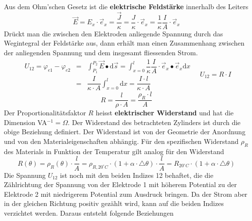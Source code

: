 \noindent Aus dem Ohm'schen Gesetz ist die \textbf{elektrische Feldstärke} innerhalb des Leiters 
\begin{equation}
\boxed{\overrightarrow{E}=E_x\cdot \overrightarrow{e}_x=\dfrac{\overrightarrow{J}}{\kappa}=\dfrac{J}{\kappa}\cdot \overrightarrow{e}_x=\dfrac{1}{\kappa}\dfrac{I}{A}\cdot \overrightarrow{e}_x}
\end{equation}
Drückt man die zwischen den Elektroden anliegende Spannung durch das Wegintegral der Feldstärke aus, dann erhält man einen Zusammenhang zwischen der anliegenden Spannung und dem insgesamt fliessenden Strom.
\begin{equation}
\boxed{
\begin{array}{lll}
U_{12}=\varphi_{e1}-\varphi_{e2}&=&\displaystyle \int_{P_1}^{P_2}\overrightarrow{E}\bullet \text{d}\overrightarrow{s}=\displaystyle \int_{x=0}^l\dfrac{1}{\kappa}\dfrac{I}{A}\cdot \overrightarrow{e}_x\bullet \overrightarrow{e}_x\text{d}x\\
&=&\dfrac{I}{\kappa \cdot A}\displaystyle \int_{x=0}^l\text{d}x=\dfrac{I\cdot l}{\kappa\cdot A}
\end{array}
}\quad 
\boxed{U_{12}=R\cdot I}
\end{equation}
\begin{equation}
\boxed{R=\dfrac{l}{\rho\cdot A}=\dfrac{\rho_R\cdot l}{A}}
\end{equation}
Der Proportionalitätsfaktor $R$ heisst \textbf{elektrischer Widerstand} und hat die Dimension VA$^{-1}=\Omega$. Der Widerstand des betrachteten Zylinders ist durch die obige Beziehung definiert. Der Widerstand ist von der Geometrie der Anordnung und von den Materialeigenschaften abhängig.
\newline\newline
Für den spezifischen Widerstand $\rho_R$ des Materials in Funktion der Temperatur gilt analog für den Widerstand
\begin{equation}
\boxed{R\left(\theta\right)=\rho_R\left(\theta\right)\cdot \dfrac{l}{A}=\rho_{R,20^{\circ}C}\cdot \left(1+\alpha\cdot \triangle \theta\right)\cdot \dfrac{l}{A}=R_{20^{\circ}C}\cdot \left(1+\alpha\cdot \triangle \theta\right)}
\end{equation}
Die Spannung $U_{12}$ ist noch mit den beiden Indizes 12 behaftet, die die Zählrichtung der Spannung von der Elektrode 1 mit höherem Potential zu der Elektrode 2 mit niedrigerem  Potential zum Ausdruck bringen. Da der Strom aber in der gleichen Richtung positiv gezählt wird, kann auf die beiden Indizes verzichtet werden. Daraus entsteht folgende Beziehungen
